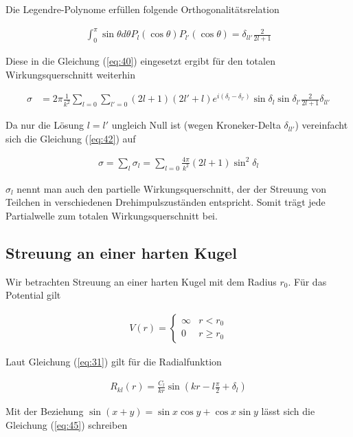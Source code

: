 Die Legendre-Polynome erfüllen folgende Orthogonalitätsrelation

\begin{align}
  \label{eq:41}
  \int_0^{\pi}\sin\theta d\theta P_l(\cos\theta)P_{l'}(\cos\theta) = \delta_{ll'}\frac{2}{2l+1}
\end{align}

Diese in die Gleichung (\ref{eq:40}) eingesetzt ergibt für den totalen Wirkungsquerschnitt weiterhin

\begin{align}
  \label{eq:42}
  \sigma &= 2\pi  \frac{1}{k^2}\sum_{l=0}\sum_{l'=0}(2l+1)(2l'+l)e^{i(\delta_l - \delta_{l'})}\sin\delta_l\sin\delta_{l'}  \frac{2}{2l+1} \delta_{ll'}
\end{align}

Da nur die Lösung \(l=l'\) ungleich Null ist (wegen Kroneker-Delta \(\delta_{ll'} \)) vereinfacht sich die Gleichung (\ref{eq:42}) auf

\begin{align}
  \label{eq:43}
   \boxed{ \sigma = \sum_l\sigma_l = \sum_{l=0}    \frac{4 \pi}{k^2} (2l+1)\sin^2\delta_l }
\end{align}

\(\sigma_l\) nennt man auch den partielle Wirkungsquerschnitt, der der Streuung von Teilchen in verschiedenen Drehimpulszuständen entspricht. Somit trägt jede Partialwelle zum totalen Wirkungsquerschnitt bei.

\subsection*{Streuung an einer harten Kugel}

Wir betrachten Streuung an einer harten Kugel mit dem Radius \(r_0\). Für das Potential gilt

\begin{align}
  \label{eq:44}
  V(r) =
  \begin{cases}
    \infty&r<r_0\\
    0&r\ge r_0
  \end{cases}
\end{align}

Laut Gleichung (\ref{eq:31}) gilt für die Radialfunktion

\begin{align}
  \label{eq:45}
   R_{kl}(r) = \frac{C_l}{kr}  \sin\left(kr-l\frac{\pi}{2} + \delta_l\right)
\end{align}

Mit der Beziehung \(\sin(x+y)=\sin x\cos y + \cos x \sin y\) lässt sich die Gleichung (\ref{eq:45}) schreiben

